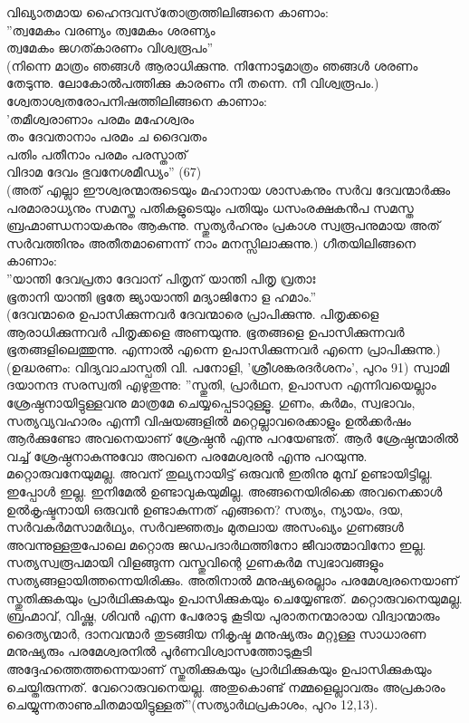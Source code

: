 വിഖ്യാതമായ ഹൈന്ദവസ്‌തോത്രത്തിലിങ്ങനെ കാണാം:\\
''ത്വമേകം വരണ്യം ത്വമേകം ശരണ്യം\\
ത്വമേകം ജഗത്കാരണം വിശ്വരൂപം''\\
(നിന്നെ മാത്രം ഞങ്ങള്‍ ആരാധിക്കുന്നു. നിന്നോടുമാത്രം ഞങ്ങള്‍ ശരണം തേടുന്നു. ലോകോല്‍പത്തിക്കു കാരണം നീ തന്നെ. നീ വിശ്വരൂപം.)\\
ശ്വേതാശ്വതരോപനിഷത്തിലിങ്ങനെ കാണാം:\\
'തമീശ്വരാണാം പരമം മഹേശ്വരം\\
തം ദേവതാനാം പരമം ച ദൈവതം\\
പതിം പതീനാം പരമം പരസ്താത്\\
വിദാമ ദേവം ഭുവനേശമീഡ്യം'' (67)\\
(അത് എല്ലാ ഈശ്വരന്മാരുടെയും മഹാനായ ശാസകനും സര്‍വ ദേവന്മാര്‍ക്കും പരമാരാധ്യനും സമസ്ത പതികളുടെയും പതിയും ധസംരക്ഷകന്‍പ സമസ്ത ബ്രഹ്മാണ്ഡനായകനും ആകുന്നു. സ്തുത്യര്‍ഹനും പ്രകാശ സ്വരൂപനുമായ അത് സര്‍വത്തിനും അതീതമാണെന്ന് നാം മനസ്സിലാക്കുന്നു.)
ഗീതയിലിങ്ങനെ കാണാം:\\
''യാന്തി ദേവപ്രതാ ദേവാന് പിതൃന് യാന്തി പിതൃ വ്രതാഃ\\
ഭൂതാനി യാന്തി ഭൂതേ ജ്യായാന്തി മദ്യാജിനോ ള ഹമാം.''\\
(ദേവന്മാരെ ഉപാസിക്കുന്നവര്‍ ദേവന്മാരെ പ്രാപിക്കുന്നു. പിതൃക്കളെ ആരാധിക്കുന്നവര്‍ പിതൃക്കളെ അണയുന്നു. ഭൂതങ്ങളെ ഉപാസിക്കുന്നവര്‍ ഭൂതങ്ങളിലെത്തുന്നു. എന്നാല്‍ എന്നെ ഉപാസിക്കുന്നവര്‍ എന്നെ പ്രാപിക്കുന്നു.) (ഉദ്ധരണം: വിദ്യവാചാസ്പതി വി. പനോളി, 'ശ്രീശങ്കരദര്‍ശനം', പുറം 91)
സ്വാമി ദയാനന്ദ സരസ്വതി എഴുതുന്നു: ''സ്തുതി, പ്രാര്‍ഥന, ഉപാസന എന്നിവയെല്ലാം ശ്രേഷ്ഠനായിട്ടുള്ളവനു മാത്രമേ ചെയ്യപ്പെടാറുള്ളൂ. ഗുണം, കര്‍മം, സ്വഭാവം, സത്യവ്യവഹാരം എന്നീ വിഷയങ്ങളില്‍ മറ്റെല്ലാവരെക്കാളും ഉല്‍ക്കര്‍ഷം ആര്‍ക്കുണ്ടോ അവനെയാണ് ശ്രേഷ്ഠന്‍ എന്നു പറയേണ്ടത്. ആര്‍ ശ്രേഷ്ഠന്മാരില്‍ വച്ച് ശ്രേഷ്ഠനാകുന്നുവോ അവനെ പരമേശ്വരന്‍ എന്നു പറയുന്നു. മറ്റൊരുവനേയുമല്ല. അവന് തുല്യനായിട്ട് ഒരുവന്‍ ഇതിനു മുമ്പ് ഉണ്ടായിട്ടില്ല. ഇപ്പോള്‍ ഇല്ല. ഇനിമേല്‍ ഉണ്ടാവുകയുമില്ല. അങ്ങനെയിരിക്കെ അവനെക്കാള്‍ ഉല്‍കൃഷ്ടനായി ഒരുവന്‍ ഉണ്ടാകുന്നത് എങ്ങനെ? സത്യം, ന്യായം, ദയ, സര്‍വകര്‍മസാമര്‍ഥ്യം, സര്‍വജ്ഞത്വം മുതലായ അസംഖ്യം ഗുണങ്ങള്‍ അവന്നുള്ളതുപോലെ മറ്റൊരു ജഡപദാര്‍ഥത്തിനോ ജീവാത്മാവിനോ ഇല്ല. സത്യസ്വരൂപമായി വിളങ്ങുന്ന വസ്തുവിന്റെ ഗുണകര്‍മ സ്വഭാവങ്ങളും സത്യങ്ങളായിത്തന്നെയിരിക്കും. അതിനാല്‍ മനുഷ്യരെല്ലാം പരമേശ്വരനെയാണ് സ്തുതിക്കുകയും പ്രാര്‍ഥിക്കുകയും ഉപാസിക്കുകയും ചെയ്യേണ്ടത്. മറ്റൊരുവനെയുമല്ല. ബ്രഹ്മാവ്, വിഷ്ണു, ശിവന്‍ എന്ന പേരോടു കൂടിയ പുരാതനന്മാരായ വിദ്വാന്മാരും ദൈത്യന്മാര്‍, ദാനവന്മാര്‍ തുടങ്ങിയ നികൃഷ്ട മനുഷ്യരും മറ്റുള്ള സാധാരണ മനുഷ്യരും പരമേശ്വരനില്‍ പൂര്‍ണവിശ്വാസത്തോടുകൂടി അദ്ദേഹത്തെത്തന്നെയാണ് സ്തുതിക്കുകയും പ്രാര്‍ഥിക്കുകയും ഉപാസിക്കുകയും ചെയ്തിരുന്നത്. വേറൊരുവനെയല്ല. അതുകൊണ്ട് നമ്മളെല്ലാവരും അപ്രകാരം ചെയ്യുന്നതാണുചിതമായിട്ടുള്ളത്''(സത്യാര്‍ഥപ്രകാശം, പുറം 12,13).
